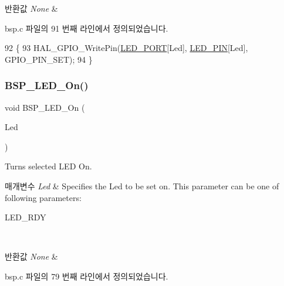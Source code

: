 \begin{DoxyRetVals}{반환값}
{\em None} & \\
\hline
\end{DoxyRetVals}


bsp.\+c 파일의 91 번째 라인에서 정의되었습니다.


\begin{DoxyCode}
92 \{
93   HAL\_GPIO\_WritePin(\mbox{\hyperlink{bsp_8c_a1127c0cf12e4ec7a66f2a64cd7407218}{LED\_PORT}}[Led], \mbox{\hyperlink{bsp_8c_a51722a2d3aff3970f123a94ac62b908f}{LED\_PIN}}[Led], GPIO\_PIN\_SET); 
94 \}
\end{DoxyCode}
\mbox{\label{group___lory_s_d_k___l_e_d___functions_gaee9c16b16384834c69efabf58f423d6f}} 
\subsubsection{\texorpdfstring{B\+S\+P\+\_\+\+L\+E\+D\+\_\+\+On()}{BSP\_LED\_On()}}
{\footnotesize\ttfamily void B\+S\+P\+\_\+\+L\+E\+D\+\_\+\+On (\begin{DoxyParamCaption}\item[{\mbox{\hyperlink{_lory_s_d_k__hw__conf_8h_aa059704b7ca945eb9c1e7f2c3d03fecd}{Led\+\_\+\+Type\+Def}}}]{Led }\end{DoxyParamCaption})}



Turns selected L\+ED On. 


\begin{DoxyParams}{매개변수}
{\em Led} & Specifies the Led to be set on. This parameter can be one of following parameters\+: \begin{DoxyItemize}
\item L\+E\+D\+\_\+\+R\+DY \end{DoxyItemize}
\\
\hline
\end{DoxyParams}

\begin{DoxyRetVals}{반환값}
{\em None} & \\
\hline
\end{DoxyRetVals}


bsp.\+c 파일의 79 번째 라인에서 정의되었습니다.


